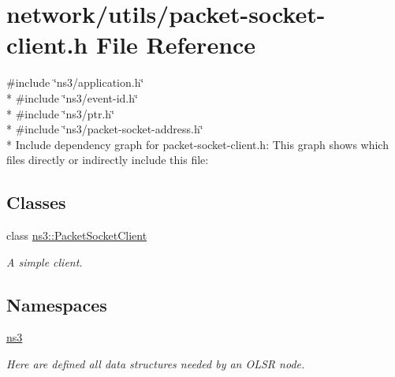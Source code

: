 \hypertarget{packet-socket-client_8h}{}\section{network/utils/packet-\/socket-\/client.h File Reference}
\label{packet-socket-client_8h}
{\ttfamily \#include \char`\"{}ns3/application.\+h\char`\"{}}\\*
{\ttfamily \#include \char`\"{}ns3/event-\/id.\+h\char`\"{}}\\*
{\ttfamily \#include \char`\"{}ns3/ptr.\+h\char`\"{}}\\*
{\ttfamily \#include \char`\"{}ns3/packet-\/socket-\/address.\+h\char`\"{}}\\*
Include dependency graph for packet-\/socket-\/client.h\+:
This graph shows which files directly or indirectly include this file\+:
\subsection*{Classes}
\begin{DoxyCompactItemize}
\item 
class \hyperlink{classns3_1_1PacketSocketClient}{ns3\+::\+Packet\+Socket\+Client}
\begin{DoxyCompactList}\small\item\em A simple client. \end{DoxyCompactList}\end{DoxyCompactItemize}
\subsection*{Namespaces}
\begin{DoxyCompactItemize}
\item 
 \hyperlink{namespacens3}{ns3}
\begin{DoxyCompactList}\small\item\em Here are defined all data structures needed by an O\+L\+SR node. \end{DoxyCompactList}\end{DoxyCompactItemize}
